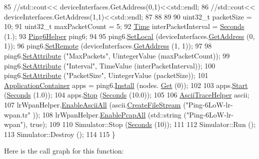 \begin{DoxyCode}
85   \textcolor{comment}{//std::cout<< deviceInterfaces.GetAddress(0,1)<<std::endl;}
86   \textcolor{comment}{//std::cout<< deviceInterfaces.GetAddress(1,1)<<std::endl;}
87 
88 
89    
90   uint32\_t packetSize = 10;
91   uint32\_t maxPacketCount = 5;
92   \hyperlink{classns3_1_1Time}{Time} interPacketInterval = \hyperlink{group__timecivil_ga33c34b816f8ff6628e33d5c8e9713b9e}{Seconds} (1.);
93   \hyperlink{classns3_1_1Ping6Helper}{Ping6Helper} ping6;
94 
95   ping6.\hyperlink{classns3_1_1Ping6Helper_aa1453d2ea29e762a3ae161a8099192e2}{SetLocal} (deviceInterfaces.\hyperlink{classns3_1_1Ipv6InterfaceContainer_ac888a9b8e70b501e44fdb12e4adc7d79}{GetAddress} (0, 1));
96   ping6.\hyperlink{classns3_1_1Ping6Helper_a1a2aaa6931daf3c493ceae3138f26072}{SetRemote} (deviceInterfaces.\hyperlink{classns3_1_1Ipv6InterfaceContainer_ac888a9b8e70b501e44fdb12e4adc7d79}{GetAddress} (1, 1));
97 
98   ping6.\hyperlink{classns3_1_1Ping6Helper_aa049dde33bc4f712b7bf79e16da1243e}{SetAttribute} (\textcolor{stringliteral}{"MaxPackets"}, UintegerValue (maxPacketCount));
99   ping6.\hyperlink{classns3_1_1Ping6Helper_aa049dde33bc4f712b7bf79e16da1243e}{SetAttribute} (\textcolor{stringliteral}{"Interval"}, TimeValue (interPacketInterval));
100   ping6.\hyperlink{classns3_1_1Ping6Helper_aa049dde33bc4f712b7bf79e16da1243e}{SetAttribute} (\textcolor{stringliteral}{"PacketSize"}, UintegerValue (packetSize));
101   \hyperlink{classns3_1_1ApplicationContainer}{ApplicationContainer} apps = ping6.\hyperlink{classns3_1_1Ping6Helper_a3f450b54b353b5181dec6c6d69733e0a}{Install} (nodes.
      \hyperlink{classns3_1_1NodeContainer_a9ed96e2ecc22e0f5a3d4842eb9bf90bf}{Get} (0));
102 
103   apps.\hyperlink{classns3_1_1ApplicationContainer_a8eff87926507020bbe3e1390358a54a7}{Start} (\hyperlink{group__timecivil_ga33c34b816f8ff6628e33d5c8e9713b9e}{Seconds} (1.0));
104   apps.\hyperlink{classns3_1_1ApplicationContainer_adfc52f9aa4020c8714679b00bbb9ddb3}{Stop} (\hyperlink{group__timecivil_ga33c34b816f8ff6628e33d5c8e9713b9e}{Seconds} (10.0));
105 
106   \hyperlink{classns3_1_1AsciiTraceHelper}{AsciiTraceHelper} ascii;
107   lrWpanHelper.\hyperlink{classns3_1_1AsciiTraceHelperForDevice_a63e57c878526c732924e14c1e52cca8b}{EnableAsciiAll} (ascii.\hyperlink{classns3_1_1AsciiTraceHelper_a44960bf2ca32835024eaedd26d1c4f94}{CreateFileStream} (\textcolor{stringliteral}{"Ping-6LoW-lr-wpan.tr"}
      ));
108   lrWpanHelper.\hyperlink{classns3_1_1PcapHelperForDevice_a4ab183a2512120200d4a0e5d8ececd49}{EnablePcapAll} (std::string (\textcolor{stringliteral}{"Ping-6LoW-lr-wpan"}), \textcolor{keyword}{true});
109   
110   Simulator::Stop (\hyperlink{group__timecivil_ga33c34b816f8ff6628e33d5c8e9713b9e}{Seconds} (10));
111   
112   Simulator::Run ();
113   Simulator::Destroy ();
114 
115 \}
\end{DoxyCode}


Here is the call graph for this function\+:


